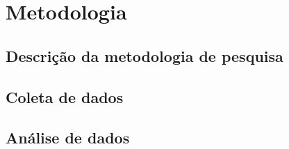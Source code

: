 \chapter{Metodologia}\label{chp:Methodology}

\section{Descrição da metodologia de pesquisa}
\section{Coleta de dados}
\section{Análise de dados}